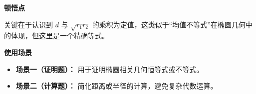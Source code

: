 \begin{explanationbox}
\par\medskip\noindent
\textbf{\textcolor{CExplanation}{顿悟点}}

关键在于认识到 $d$ 与 $\sqrt{r_1 r_2}$ 的乘积为定值，这类似于“均值不等式”在椭圆几何中的体现，但这里是一个精确等式。

\par\medskip\noindent
\textbf{\textcolor{CExplanation}{使用场景}}
\begin{itemize}[leftmargin=*, itemsep=0.5em, topsep=0.4em]
    \item \textbf{场景一（证明题）：} 用于证明椭圆相关几何恒等式或不等式。
    \item \textbf{场景二（计算题）：} 简化距离或半径的计算，避免复杂代数运算。
\end{itemize}
\end{explanationbox}
